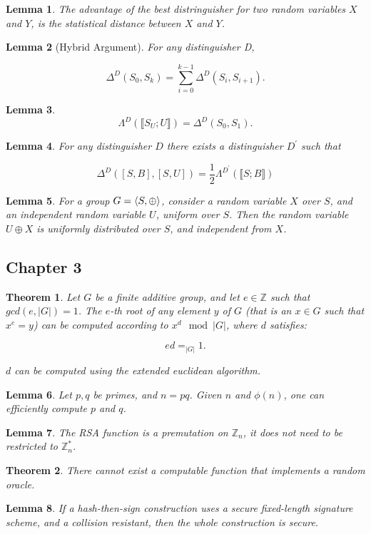 \documentclass[a4paper,german]{article}
\newtheorem{theorem}{Theorem}
\newtheorem{lemma}{Lemma}
\begin{document}
\begin{lemma}
	The advantage of the best distringuisher for two random variables $X$ and $Y$, is the statistical distance between $X$ and $Y$.
\end{lemma}

\begin{lemma}[Hybrid Argument]
	For any distinguisher D,

	\[
		\Delta^D(S_0, S_k) = \sum\limits_{i=0}^{k-1} \Delta^D(S_i, S_{i+1})
	.\] 
\end{lemma}

\begin{lemma}
	\[
		\Lambda^D(\llbracket S_U ; U \rrbracket) = \Delta^D(S_0, S_1).
	\]
\end{lemma}

\begin{lemma}
	For any distinguisher $D$ there exists a distinguisher $D^\prime$ such that 

	\[
		\Delta^D([S, B], [S,U]) = \frac{1}{2}\Lambda^{D^\prime}(\llbracket S; B\rrbracket)
	\] 
\end{lemma}

\begin{lemma}
	For a group $G = \braket{S, \oplus}$, consider a random variable $X$ over $S$, and an independent random variable $U$, uniform over $S$. Then the random variable $U \oplus X$ is uniformly distributed over $S$, and independent from $X$.
\end{lemma}

\subsection*{Chapter 3}
\begin{theorem}
	Let $G$ be a finite additive group, and let $e \in \mathbb{Z}$ such that $gcd(e, |G|)=1$. The $e$-th root of any element $y$ of $G$ (that is an $x \in G$ such that $x^e = y$) can be computed according to $x^d \mod |G|$, where $d$ satisfies:

	\[
		ed =_{|G|} 1 
	.\] 

	$d$ can be computed using the extended euclidean algorithm.
\end{theorem}

\begin{lemma}
	Let $p, q$ be primes, and $n = pq$. Given $n$ and $\phi(n)$, one can efficiently compute $p$ and $q$.
	
\end{lemma}

\begin{lemma}
	The RSA function is a premutation on $\mathbb{Z}_n$, it does not need to be restricted to $\mathbb{Z}^*_n$.
\end{lemma}

\begin{theorem}
	There cannot exist a computable function that implements a random oracle.
\end{theorem}

\begin{lemma}
	If a hash-then-sign construction uses a secure fixed-length signature scheme, and a collision resistant, then the whole construction is secure. 
\end{lemma}
\end{document}
